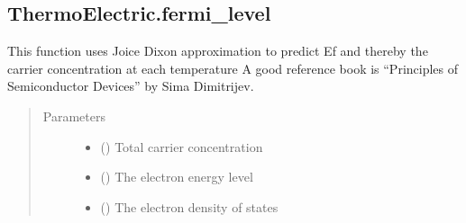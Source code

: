 \documentclass[letterpaper,10pt,english]{sphinxmanual}
\begin{document}
\subsection{ThermoElectric.fermi\_level}
\label{\detokenize{autosummary/ThermoElectric.fermi_level:thermoelectric-fermi-level}}\label{\detokenize{autosummary/ThermoElectric.fermi_level::doc}}

\begin{fulllineitems}
\label{\detokenize{autosummary/ThermoElectric.fermi_level:ThermoElectric.fermi_level}}
\sphinxAtStartPar
This function uses Joice Dixon approximation to predict Ef and thereby the carrier concentration at each temperature
A good reference book is “Principles of Semiconductor Devices” by Sima Dimitrijev.
\begin{quote}\begin{description}
\item[{Parameters}] \leavevmode\begin{itemize}
\item {} 
\sphinxAtStartPar
{} () \textendash{} Total carrier concentration

\item {} 
\sphinxAtStartPar
{} () \textendash{} The electron energy level

\item {} 
\sphinxAtStartPar
{} () \textendash{} The electron density of states


\end{itemize}
\end{description}
\end{quote}
\end{fulllineitems}
\end{document}
